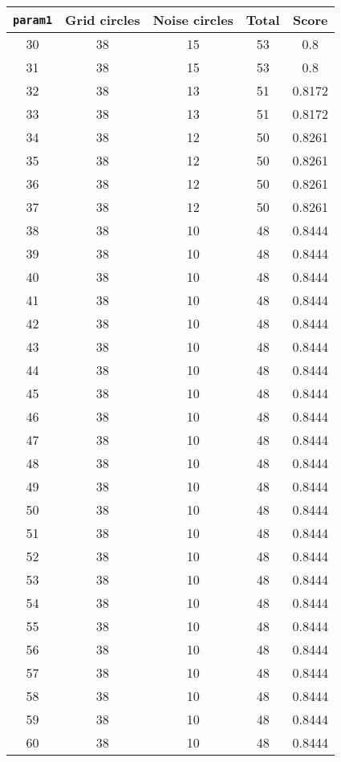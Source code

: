 \documentclass[letterpaper, 12pt]{article}
\begin{document}
\begin{longtable}{|c|c|c|c|c|}
\hline
\textbf{\texttt{param1}} & \textbf{Grid circles} & \textbf{Noise circles} & \textbf{Total} & \textbf{Score} \\
\hline
30 & 38 & 15 & 53 & 0.8 \\
\hline
31 & 38 & 15 & 53 & 0.8 \\
\hline
32 & 38 & 13 & 51 & 0.8172 \\
\hline
33 & 38 & 13 & 51 & 0.8172 \\
\hline
34 & 38 & 12 & 50 & 0.8261 \\
\hline
35 & 38 & 12 & 50 & 0.8261 \\
\hline
36 & 38 & 12 & 50 & 0.8261 \\
\hline
37 & 38 & 12 & 50 & 0.8261 \\
\hline
38 & 38 & 10 & 48 & 0.8444 \\
\hline
39 & 38 & 10 & 48 & 0.8444 \\
\hline
40 & 38 & 10 & 48 & 0.8444 \\
\hline
41 & 38 & 10 & 48 & 0.8444 \\
\hline
42 & 38 & 10 & 48 & 0.8444 \\
\hline
43 & 38 & 10 & 48 & 0.8444 \\
\hline
44 & 38 & 10 & 48 & 0.8444 \\
\hline
45 & 38 & 10 & 48 & 0.8444 \\
\hline
46 & 38 & 10 & 48 & 0.8444 \\
\hline
47 & 38 & 10 & 48 & 0.8444 \\
\hline
48 & 38 & 10 & 48 & 0.8444 \\
\hline
49 & 38 & 10 & 48 & 0.8444 \\
\hline
50 & 38 & 10 & 48 & 0.8444 \\
\hline
51 & 38 & 10 & 48 & 0.8444 \\
\hline
52 & 38 & 10 & 48 & 0.8444 \\
\hline
53 & 38 & 10 & 48 & 0.8444 \\
\hline
54 & 38 & 10 & 48 & 0.8444 \\
\hline
55 & 38 & 10 & 48 & 0.8444 \\
\hline
56 & 38 & 10 & 48 & 0.8444 \\
\hline
57 & 38 & 10 & 48 & 0.8444 \\
\hline
58 & 38 & 10 & 48 & 0.8444 \\
\hline
59 & 38 & 10 & 48 & 0.8444 \\
\hline
60 & 38 & 10 & 48 & 0.8444 \\

\end{longtable}
\end{document}

